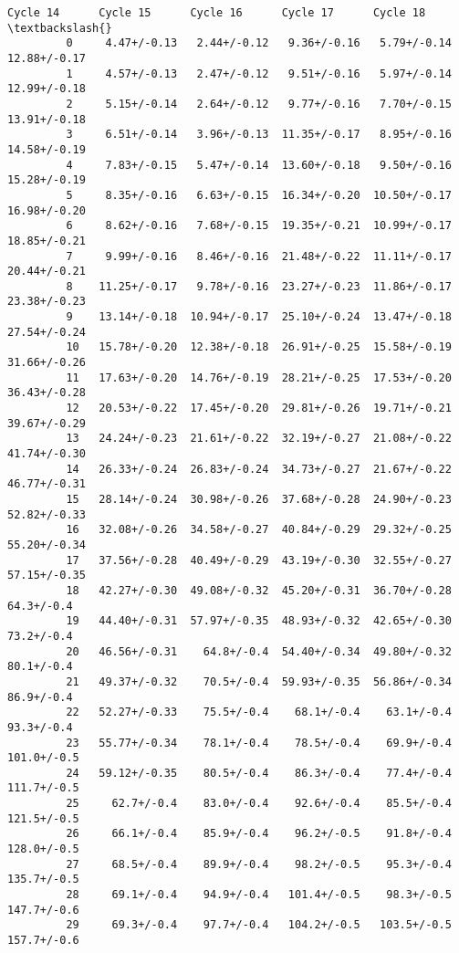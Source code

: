 \documentclass[11pt]{article}
\begin{document}
\begin{Verbatim}[commandchars=\\\{\}]
                  Cycle 14      Cycle 15      Cycle 16      Cycle 17      Cycle 18  \textbackslash{}
         0     4.47+/-0.13   2.44+/-0.12   9.36+/-0.16   5.79+/-0.14  12.88+/-0.17   
         1     4.57+/-0.13   2.47+/-0.12   9.51+/-0.16   5.97+/-0.14  12.99+/-0.18   
         2     5.15+/-0.14   2.64+/-0.12   9.77+/-0.16   7.70+/-0.15  13.91+/-0.18   
         3     6.51+/-0.14   3.96+/-0.13  11.35+/-0.17   8.95+/-0.16  14.58+/-0.19   
         4     7.83+/-0.15   5.47+/-0.14  13.60+/-0.18   9.50+/-0.16  15.28+/-0.19   
         5     8.35+/-0.16   6.63+/-0.15  16.34+/-0.20  10.50+/-0.17  16.98+/-0.20   
         6     8.62+/-0.16   7.68+/-0.15  19.35+/-0.21  10.99+/-0.17  18.85+/-0.21   
         7     9.99+/-0.16   8.46+/-0.16  21.48+/-0.22  11.11+/-0.17  20.44+/-0.21   
         8    11.25+/-0.17   9.78+/-0.16  23.27+/-0.23  11.86+/-0.17  23.38+/-0.23   
         9    13.14+/-0.18  10.94+/-0.17  25.10+/-0.24  13.47+/-0.18  27.54+/-0.24   
         10   15.78+/-0.20  12.38+/-0.18  26.91+/-0.25  15.58+/-0.19  31.66+/-0.26   
         11   17.63+/-0.20  14.76+/-0.19  28.21+/-0.25  17.53+/-0.20  36.43+/-0.28   
         12   20.53+/-0.22  17.45+/-0.20  29.81+/-0.26  19.71+/-0.21  39.67+/-0.29   
         13   24.24+/-0.23  21.61+/-0.22  32.19+/-0.27  21.08+/-0.22  41.74+/-0.30   
         14   26.33+/-0.24  26.83+/-0.24  34.73+/-0.27  21.67+/-0.22  46.77+/-0.31   
         15   28.14+/-0.24  30.98+/-0.26  37.68+/-0.28  24.90+/-0.23  52.82+/-0.33   
         16   32.08+/-0.26  34.58+/-0.27  40.84+/-0.29  29.32+/-0.25  55.20+/-0.34   
         17   37.56+/-0.28  40.49+/-0.29  43.19+/-0.30  32.55+/-0.27  57.15+/-0.35   
         18   42.27+/-0.30  49.08+/-0.32  45.20+/-0.31  36.70+/-0.28    64.3+/-0.4   
         19   44.40+/-0.31  57.97+/-0.35  48.93+/-0.32  42.65+/-0.30    73.2+/-0.4   
         20   46.56+/-0.31    64.8+/-0.4  54.40+/-0.34  49.80+/-0.32    80.1+/-0.4   
         21   49.37+/-0.32    70.5+/-0.4  59.93+/-0.35  56.86+/-0.34    86.9+/-0.4   
         22   52.27+/-0.33    75.5+/-0.4    68.1+/-0.4    63.1+/-0.4    93.3+/-0.4   
         23   55.77+/-0.34    78.1+/-0.4    78.5+/-0.4    69.9+/-0.4   101.0+/-0.5   
         24   59.12+/-0.35    80.5+/-0.4    86.3+/-0.4    77.4+/-0.4   111.7+/-0.5   
         25     62.7+/-0.4    83.0+/-0.4    92.6+/-0.4    85.5+/-0.4   121.5+/-0.5   
         26     66.1+/-0.4    85.9+/-0.4    96.2+/-0.5    91.8+/-0.4   128.0+/-0.5   
         27     68.5+/-0.4    89.9+/-0.4    98.2+/-0.5    95.3+/-0.4   135.7+/-0.5   
         28     69.1+/-0.4    94.9+/-0.4   101.4+/-0.5    98.3+/-0.5   147.7+/-0.6   
         29     69.3+/-0.4    97.7+/-0.4   104.2+/-0.5   103.5+/-0.5   157.7+/-0.6   

\end{Verbatim}
\end{document}
